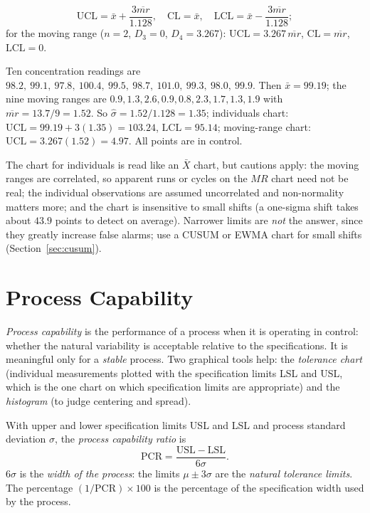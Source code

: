 \begin{theorem}\label{thm:individuals}
\[ \mathrm{UCL}=\bar{x}+\frac{3\overline{mr}}{1.128},\quad\mathrm{CL}=\bar{x},\quad\mathrm{LCL}=\bar{x}-\frac{3\overline{mr}}{1.128}; \]
for the moving range ($n=2$, $D_3=0$, $D_4=3.267$): $\mathrm{UCL}=3.267\,\overline{mr}$, $\mathrm{CL}=\overline{mr}$, $\mathrm{LCL}=0$.
\end{theorem}

\begin{example}
Ten concentration readings are $98.2,\ 99.1,\ 97.8,\ 100.4,\ 99.5,\ 98.7,\ 101.0,\ 99.3,\ 98.0,\ 99.9$. Then $\bar{x}=99.19$; the nine moving ranges are $0.9,1.3,2.6,0.9,0.8,2.3,1.7,1.3,1.9$ with $\overline{mr}=13.7/9=1.52$. So $\hat\sigma=1.52/1.128=1.35$; individuals chart: $\mathrm{UCL}=99.19+3(1.35)=103.24$, $\mathrm{LCL}=95.14$; moving-range chart: $\mathrm{UCL}=3.267(1.52)=4.97$. All points are in control.
\end{example}

The chart for individuals is read like an $\bar{X}$ chart, but cautions apply: the moving ranges are correlated, so apparent runs or cycles on the $MR$ chart need not be real; the individual observations are assumed uncorrelated and non-normality matters more; and the chart is insensitive to small shifts (a one-sigma shift takes about $43.9$ points to detect on average). Narrower limits are \emph{not} the answer, since they greatly increase false alarms; use a CUSUM or EWMA chart for small shifts (Section~\ref{sec:cusum}).

\section{Process Capability}

\emph{Process capability} is the performance of a process when it is operating in control: whether the natural variability is acceptable relative to the specifications. It is meaningful only for a \emph{stable} process. Two graphical tools help: the \emph{tolerance chart} (individual measurements plotted with the specification limits LSL and USL, which is the one chart on which specification limits are appropriate) and the \emph{histogram} (to judge centering and spread).

\begin{definition}
With upper and lower specification limits USL and LSL and process standard deviation $\sigma$, the \emph{process capability ratio} is
\[ \mathrm{PCR}=\frac{\mathrm{USL}-\mathrm{LSL}}{6\sigma}. \]
$6\sigma$ is the \emph{width of the process}: the limits $\mu\pm3\sigma$ are the \emph{natural tolerance limits}. The percentage $(1/\mathrm{PCR})\times100$ is the percentage of the specification width used by the process.
\end{definition}

